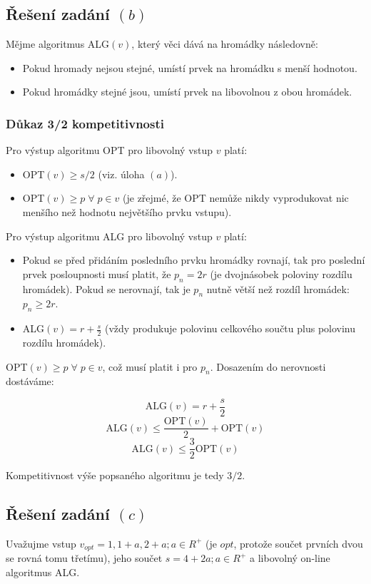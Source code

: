 \documentclass[a4paper, 12pt]{article}
\begin{document}
  \subsection{Řešení zadání $(b)$}
  Mějme algoritmus ALG$(v)$, který věci dává na hromádky následovně:
  \begin{itemize}
    \item Pokud hromady nejsou stejné, umístí prvek na hromádku s menší hodnotou.
    \item Pokud hromádky stejné jsou, umístí prvek na libovolnou z obou hromádek.
  \end{itemize}

  \subsubsection{Důkaz 3/2 kompetitivnosti}
  Pro výstup algoritmu OPT pro libovolný vstup $v$ platí:
  \begin{itemize}
    \item OPT$(v) \ge s/2$ (viz. úloha $(a)$).
    \item OPT$(v) \ge p \; \forall \; p \in v$ (je zřejmé, že OPT nemůže nikdy vyprodukovat nic menšího než hodnotu největšího prvku vstupu).
  \end{itemize}

  Pro výstup algoritmu ALG pro libovolný vstup $v$ platí:
  \begin{itemize}
    \item Pokud se před přidáním posledního prvku hromádky rovnají, tak pro poslední prvek posloupnosti musí platit, že $p_n=2r$ (je dvojnásobek poloviny rozdílu hromádek). Pokud se nerovnají, tak je $p_n$ nutně větší než rozdíl hromádek: $p_n \ge 2r$.
    \item ALG$(v)=r+\frac{s}{2}$ (vždy produkuje polovinu celkového součtu plus polovinu rozdílu hromádek).
  \end{itemize}

  OPT$(v) \ge p \; \forall \; p \in v$, což musí platit i pro $p_n$. Dosazením do nerovnosti dostáváme:

  $$\text{ALG}(v)=r+\frac{s}{2}$$
  $$\text{ALG}(v) \le \frac{\text{OPT}(v)}{2}+\text{OPT}(v)$$
  $$\text{ALG}(v) \le \frac{3}{2}\text{OPT}(v)$$

  Kompetitivnost výše popsaného algoritmu je tedy $3/2$.

  \subsection{Řešení zadání $(c)$}
  Uvažujme vstup $v_{opt}=1,1+a,2+a; a \in R^+$ (je $opt$, protože součet prvních dvou se rovná tomu třetímu), jeho součet $s=4+2a; a \in R^+$ a libovolný on-line algoritmus ALG.
\end{document}
